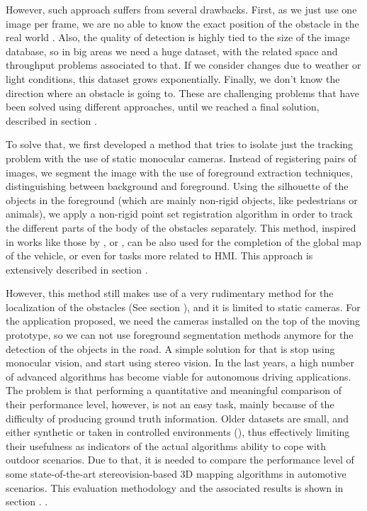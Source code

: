 However, such approach suffers from several drawbacks. First, as we just use one image per frame, we are no able to know the exact position of the obstacle in the real world . Also, the quality of detection is highly tied to the size of the image database, so in big areas we need a huge dataset, with the related space and throughput problems associated to that. If we consider changes due to weather or light conditions, this dataset grows exponentially. Finally, we don't know the direction where an obstacle is going to. These are challenging problems that have been solved using different approaches, until we reached a final solution, described in section \todo { \ref{XXX} }.

To solve that, we first developed a method that tries to isolate just the tracking problem with the use of static monocular cameras. Instead of registering pairs of images, we segment the image with the use of foreground extraction techniques, distinguishing between background and foreground. Using the silhouette of the objects in the foreground (which are mainly non-rigid objects, like pedestrians or animals), we apply a non-rigid point set registration algorithm in order to track the different parts of the body of the obstacles separately. This method, inspired in works like those by \cite{starck2007surface}, or \cite{letouzey2011scene}, can be also used for the completion of the global map of the vehicle, or even for tasks more related to \acf{HMI}. This approach is extensively described in section \todo{ \ref{XXX}}.

However, this method still makes use of a very rudimentary method for the localization of the obstacles (See section \todo{ \ref{XXX-subsection_localization}}), and it is limited to static cameras. For the application proposed, we need the cameras installed on the top of the moving prototype, so we can not use foreground segmentation methods anymore for the detection of the objects in the road. A simple solution for that is stop using monocular vision, and start using stereo vision. In the last years, a high number of advanced algorithms has become viable for autonomous driving applications. The problem is that performing a quantitative and meaningful comparison of their performance level, however, is not an easy task, mainly because of the difficulty of producing ground truth information. Older datasets are small, and either synthetic or taken in controlled environments (\cite{Scharstein2002}), thus effectively limiting their usefulness as indicators of the actual algorithms ability to cope with outdoor scenarios. Due to that, it is needed to compare the performance level of some state-of-the-art stereovision-based 3D mapping algorithms in automotive scenarios. This evaluation methodology and the associated results is shown in section \todo{ \ref{XXX}}. .


